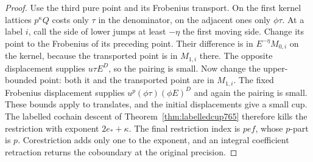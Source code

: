 \documentclass[a4paper,11pt]{article}
\theoremstyle{definition}
\theoremstyle{remark}
\numberwithin{equation}{section}
\begin{document}
\begin{proof}
Use the third pure point and its Frobenius transport.
On the first kernel lattices \(p^\kappa Q\) costs only
\(\tau\) in the denominator, on the adjacent ones only
\(\phi\tau\). At a label \(i\), call the side of lower
jumps at least \(-\eta\) the first moving side.
Change its point to the Frobenius of its preceding
point. Their difference is in \(E^{-\eta}M_{0,i}\)
on the kernel, because the transported point is in
\(M_{1,i}\) there. The opposite displacement supplies
\(u\tau E^D\), so the pairing is small. Now change
the upper-bounded point: both it and the transported
point are in \(M_{1,i}\). The fixed Frobenius displacement
supplies \(u^p(\phi\tau)(\phi E)^D\) and again the pairing
is small. These bounds apply to translates, and the
initial displacements give a small cup. The labelled
cochain descent of Theorem~\ref{thm:labelledcup765}
therefore kills the restriction with exponent \(2e_*+\kappa\).
The final restriction index is \(p e f\), whose \(p\)-part
is \(p\). Corestriction adds only one to the exponent,
and an integral coefficient retraction returns the
coboundary at the original precision.
\end{proof}
\end{document}
